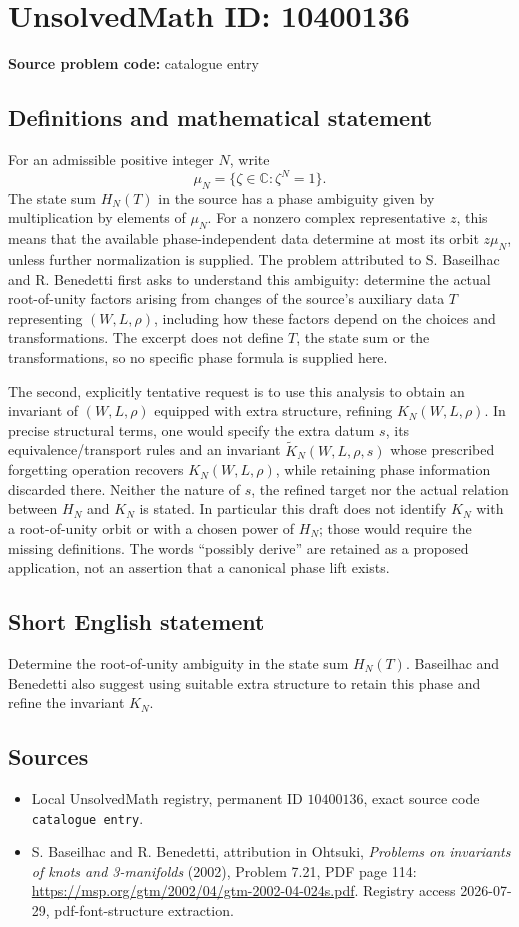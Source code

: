 \documentclass[11pt]{article}
\newcommand{\C}{\mathbb{C}}
\begin{document}
\section*{UnsolvedMath ID: 10400136}
\textbf{Source problem code:} catalogue entry
\subsection{Definitions and mathematical statement}
For an admissible positive integer \(N\), write
\[\mu_N=\{\zeta\in\C:\zeta^N=1\}.\]
The state sum \(H_N(T)\) in the source has a phase ambiguity given by multiplication by elements of \(\mu_N\). For a nonzero complex representative \(z\), this means that the available phase-independent data determine at most its orbit \(z\mu_N\), unless further normalization is supplied. The problem attributed to S. Baseilhac and R. Benedetti first asks to understand this ambiguity: determine the actual root-of-unity factors arising from changes of the source's auxiliary data \(T\) representing \((W,L,\rho)\), including how these factors depend on the choices and transformations. The excerpt does not define \(T\), the state sum or the transformations, so no specific phase formula is supplied here.

The second, explicitly tentative request is to use this analysis to obtain an invariant of \((W,L,\rho)\) equipped with extra structure, refining \(K_N(W,L,\rho)\). In precise structural terms, one would specify the extra datum \(s\), its equivalence/transport rules and an invariant \(\widetilde K_N(W,L,\rho,s)\) whose prescribed forgetting operation recovers \(K_N(W,L,\rho)\), while retaining phase information discarded there. Neither the nature of \(s\), the refined target nor the actual relation between \(H_N\) and \(K_N\) is stated. In particular this draft does not identify \(K_N\) with a root-of-unity orbit or with a chosen power of \(H_N\); those would require the missing definitions. The words ``possibly derive'' are retained as a proposed application, not an assertion that a canonical phase lift exists.
\subsection{Short English statement}
Determine the root-of-unity ambiguity in the state sum \(H_N(T)\). Baseilhac and Benedetti also suggest using suitable extra structure to retain this phase and refine the invariant \(K_N\).
\subsection{Sources}
\begin{itemize}
\item Local UnsolvedMath registry, permanent ID \(10400136\), exact source code \texttt{catalogue entry}.
\item S. Baseilhac and R. Benedetti, attribution in Ohtsuki, \emph{Problems on invariants of knots and 3-manifolds} (2002), Problem 7.21, PDF page 114: \url{https://msp.org/gtm/2002/04/gtm-2002-04-024s.pdf}. Registry access 2026-07-29, pdf-font-structure extraction.
\end{itemize}
\end{document}
